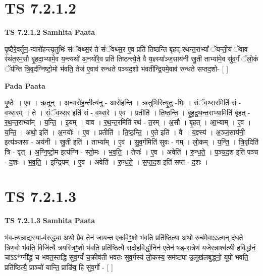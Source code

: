 \documentclass[17pt]{extarticle}
\begin{document}
\section*{ TS 7.2.1.2 }

\textbf{TS 7.2.1.2 } \newline
\textbf{Samhita Paata} \newline

पृ॒ष्ठैरे॒वर्तून॒-न्वारो॑हन्त्यृ॒तुभिः॑ संॅवथ्स॒रं ते सं॑ॅवथ्स॒र ए॒व प्रति॑ तिष्ठन्ति बृहद्-रथन्त॒राभ्यां᳚ ॅयन्ती॒यं ॅवाव र॑थंत॒रम॒सौ बृ॒हदा॒भ्यामे॒व य॒न्त्यथो॑ अ॒नयो॑रे॒व प्रति॑ तिष्ठन्त्ये॒ते वै य॒ज्ञ्स्या᳚ञ्ज॒साय॑नी स्रु॒ती ताभ्या॑मे॒व सु॑व॒र्गं ॅलो॒कं ॅय॑न्ति त्रि॒वृद॑ग्निष्टो॒मो भ॑वति॒ तेज॑ ए॒वाव॑ रुन्धते पञ्चद॒शो भ॑वतीन्द्रि॒यमे॒वाव॑ रुन्धते सप्तद॒शो- [  ] \newline

\textbf{Pada Paata} \newline

पृ॒ष्ठैः । ए॒व । ऋ॒तून् । अ॒न्वारो॑ह॒न्तीत्य॑नु - आरो॑हन्ति । ऋ॒तुभि॒रित्यृ॒तु -भिः॒ । सं॒ॅव॒थ्स॒रमिति॑ सं - व॒थ्स॒रम् । ते । सं॒ॅव॒थ्स॒र इति॑ सं - व॒थ्स॒रे । ए॒व । प्रतीति॑ । ति॒ष्ठ॒न्ति॒ । बृ॒ह॒द्र॒थ॒न्त॒राभ्या॒मिति॑ बृहत् - र॒थ॒न्त॒राभ्या᳚म् । य॒न्ति॒ । इ॒यम् । वाव । र॒थ॒न्त॒रमिति॑ रथं - त॒रम् । अ॒सौ । बृ॒हत् । आ॒भ्याम् । ए॒व । य॒न्ति॒ । अथो॒ इति॑ । अ॒नयोः᳚ । ए॒व । प्रतीति॑ । ति॒ष्ठ॒न्ति॒ । ए॒ते इति॑ । वै । य॒ज्ञ्स्य॑ । अ॒ञ्ज॒साय॑नी॒ इत्य॑ञ्जसा - अय॑नी । स्रु॒ती इति॑ । ताभ्या᳚म् । ए॒व । सु॒व॒र्गमिति॑ सुवः - गम् । लो॒कम् । य॒न्ति॒ । त्रि॒वृदिति॑ त्रि - वृत् । अ॒ग्नि॒ष्टो॒म इत्य॑ग्नि - स्तो॒मः । भ॒व॒ति॒ । तेजः॑ । ए॒व । अवेति॑ । रु॒न्ध॒ते॒ । प॒ञ्च॒द॒श इति॑ पञ्च - द॒शः । भ॒व॒ति॒ । इ॒न्द्रि॒यम् । ए॒व । अवेति॑ । रु॒न्ध॒ते॒ । स॒प्त॒द॒श इति॑ सप्त - द॒शः ।  \newline




\section*{ TS 7.2.1.3 }

\textbf{TS 7.2.1.3 } \newline
\textbf{Samhita Paata} \newline

भ॑व-त्य॒न्नाद्य॒स्या-व॑रुद्ध्या॒ अथो॒ प्रैव तेन॑ जायन्त एकविꣳ॒॒शो भ॑वति॒ प्रति॑ष्ठित्या॒ अथो॒ रुच॑मे॒वाऽऽत्मन् द॑धते त्रिण॒वो भ॑वति॒ विजि॑त्यै त्रयस्त्रिꣳ॒॒शो भ॑वति॒ प्रति॑ष्ठित्यै सदोहविर्द्धा॒निन॑ ए॒तेन॑ षड्-रा॒त्रेण॑ यजेर॒न्नाश्व॑त्थी हवि॒र्द्धानं॒ चाऽऽ*ग्नी᳚द्ध्रं च भवत॒स्तद्धि सु॑व॒र्ग्यं॑ च॒क्रीव॑ती भवतः सुव॒र्गस्य॑ लो॒कस्य॒ सम॑ष्ट्या उ॒लूख॑लबुद्ध्नो॒ यूपो॑ भवति॒ प्रति॑ष्ठित्यै॒ प्राञ्चो॑ यान्ति॒ प्राङि॑व॒ हि सु॑व॒र्गो - [  ] \newline
\end{document}
